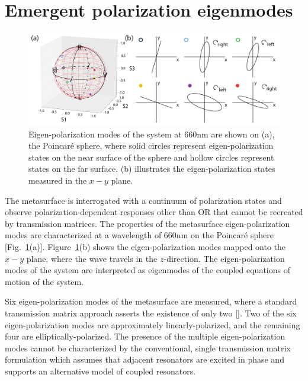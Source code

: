 \section{Emergent polarization eigenmodes}

\begin{figure}[b!]
\centering
\includegraphics[width=\linewidth]{fig-eigPols-eps-converted-to.pdf}
\caption{Eigen-polarization modes of the system at 660nm are shown on (a), the Poincar\'{e} sphere, where solid circles represent eigen-polarization states on the near surface of the sphere and hollow circles represent states on the far surface. (b) illustrates the eigen-polarization states measured in the $x-y$ plane.}  
\label{fig:eigenpolarizations} 
\end{figure}

The metasurface is interrogated with a continuum of polarization states and observe polarization-dependent responses other than OR that cannot be recreated by transmission matrices. The properties of the metasurface eigen-polarization modes are characterized at a wavelength of 660nm on the Poincar\'{e} sphere [Fig.~\ref{fig:eigenpolarizations}(a)]. Figure~\ref{fig:eigenpolarizations}(b) shows the eigen-polarization modes mapped onto the $x-y$ plane, where the wave travels in the $z$-direction. The eigen-polarization modes of the system are interpreted as eigenmodes of the coupled equations of motion of the system.

Six eigen-polarization modes of the metasurface are measured, where a standard transmission matrix approach asserts the existence of only two [\cite{Gevorgyan}]. Two of the six eigen-polarization modes are approximately linearly-polarized, and the remaining four are elliptically-polarized. The presence of the multiple eigen-polarization modes cannot be characterized by the conventional, single transmission matrix formulation \textemdash which assumes that adjacent resonators are excited in phase \textemdash and supports an alternative model of coupled resonators. 


